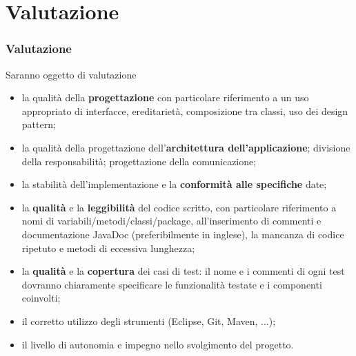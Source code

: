 \documentclass{beamer}
\begin{document}
\section{Valutazione}
\begin{frame}
\frametitle{Valutazione}

Saranno oggetto di valutazione
\begin{itemize}
\item la qualit\` a della \textbf{progettazione} con particolare riferimento a
  un uso appropriato di interfacce, ereditariet\`a, composizione tra
  classi, uso dei design pattern;
\item la qualit\` a della progettazione dell'\textbf{architettura
  dell'applicazione}; divisione della responsabilit\`a; progettazione
  della comunicazione;
\item la stabilit\` a dell'implementazione e la \textbf{conformit\` a alle
  specifiche} date; 
\item la \textbf{qualit\` a} e la \textbf{leggibilit\` a} del codice scritto, con
  particolare riferimento a nomi di variabili/metodi/classi/package,
  all'inserimento di commenti e documentazione JavaDoc
  (preferibilmente in inglese), la mancanza di codice ripetuto e
  metodi di eccessiva lunghezza;
\item la \textbf{qualit\` a} e la \textbf{copertura} dei casi di test: il nome e i
  commenti di ogni test dovranno chiaramente specificare le funzionalit\`
  a testate e i componenti coinvolti;
 \item il corretto utilizzo degli strumenti (Eclipse, Git, Maven, ...);
\item il livello di autonomia e impegno nello svolgimento del progetto.
\end{itemize}
\end{frame}
\end{document}

